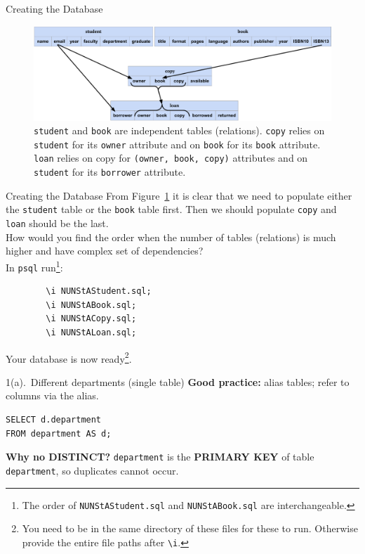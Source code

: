 \documentclass{beamer}
\begin{document}
\begin{frame}[fragile]{Creating the Database}
    \begin{figure}
        \centering
        \includegraphics[width=1\linewidth]{schema_t6.pdf}
        \caption{\texttt{student} and \texttt{book} are independent tables (relations). \texttt{copy} relies on \texttt{student} for its \texttt{owner} attribute and on \texttt{book} for its \texttt{book} attribute. \texttt{loan} relies on copy for \texttt{(owner, book, copy)} attributes and on \texttt{student} for its \texttt{borrower} attribute.}
        \label{fig:depend}
    \end{figure}
\end{frame}

\begin{frame}[fragile]{Creating the Database}
    From Figure~\ref{fig:depend} it is clear that we need to populate either the \texttt{student} table or the \texttt{book} table first. Then we should populate \texttt{copy} and \texttt{loan} should be the last. \\
    \pause
    \scriptsize
    \alert{How would you find the order when the number of tables (relations) is much higher and have complex set of dependencies?}\\
    \pause
    \normalsize
    In \texttt{psql} run\footnote{The order of \texttt{NUNStAStudent.sql} and \texttt{NUNStABook.sql} are interchangeable.}:
    \begin{lstlisting}
        \i NUNStAStudent.sql;
        \i NUNStABook.sql;
        \i NUNStACopy.sql;
        \i NUNStALoan.sql;
    \end{lstlisting}
Your database is now ready\footnote{You need to be in the same directory of these files for these to run. Otherwise provide the entire file paths after \texttt{\textbackslash i}.}.\\
\end{frame}

\begin{frame}[fragile]{1(a).\ Different departments (single table)}
\small
\textbf{Good practice:} alias tables; refer to columns via the alias.
\begin{lstlisting}
SELECT d.department
FROM department AS d;
\end{lstlisting}
\textbf{Why no DISTINCT?} \texttt{department} is the \textbf{PRIMARY KEY} of table \texttt{department}, so duplicates cannot occur.
\end{frame}
\end{document}
